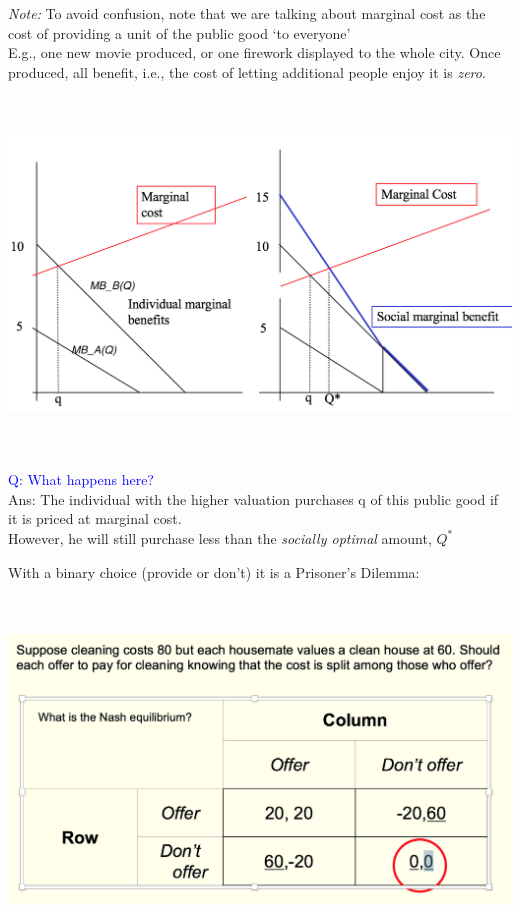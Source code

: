 \documentclass[]{article}
\begin{document}
\emph{Note:} To avoid confusion, note that we are talking about marginal
cost as the cost of providing a unit of the public good `to everyone'\\
E.g., one new movie produced, or one firework displayed to the whole
city. Once produced, all benefit, i.e., the cost of letting additional
people enjoy it is \emph{zero}.

\includegraphics[height=3.7in]{picsfigs/pgprovision2.png}

\textcolor{blue}{Q: What happens here?}\\
Ans: The individual with the higher valuation purchases q of this public
good if it is priced at marginal cost.\\

However, he will still purchase less than the \emph{socially optimal}
amount, \(Q^*\)

With a binary choice (provide or don't) it is a Prisoner's Dilemma:

\includegraphics[height=3.6in]{picsfigs/cleaningmatrix.png}
\end{document}
